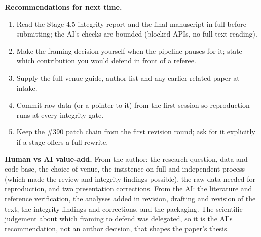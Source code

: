 \documentclass[12pt,a4paper]{article}
\providecommand{\tightlist}{\setlength{\itemsep}{0pt}\setlength{\parskip}{0pt}}
\begin{document}
\textbf{Recommendations for next time.}

\begin{enumerate}
\def\labelenumi{\arabic{enumi}.}
\tightlist
\item
  Read the Stage 4.5 integrity report and the final manuscript in full
  before submitting; the AI's checks are bounded (blocked APIs, no
  full-text reading).
\item
  Make the framing decision yourself when the pipeline pauses for it;
  state which contribution you would defend in front of a referee.
\item
  Supply the full venue guide, author list and any earlier related paper
  at intake.
\item
  Commit raw data (or a pointer to it) from the first session so
  reproduction runs at every integrity gate.
\item
  Keep the \#390 patch chain from the first revision round; ask for it
  explicitly if a stage offers a full rewrite.
\end{enumerate}

\textbf{Human vs AI value-add.} From the author: the research question,
data and code base, the choice of venue, the insistence on full and
independent process (which made the review and integrity findings
possible), the raw data needed for reproduction, and two presentation
corrections. From the AI: the literature and reference verification, the
analyses added in revision, drafting and revision of the text, the
integrity findings and corrections, and the packaging. The scientific
judgement about which framing to defend was delegated, so it is the AI's
recommendation, not an author decision, that shapes the paper's thesis.
\end{document}
